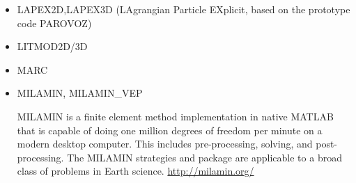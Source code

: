 \begin{itemize}
\item LAPEX2D,LAPEX3D  (LAgrangian Particle EXplicit, based on the prototype code PAROVOZ) 

\begin{scriptsize}
\cite{sopg05}\cite{baso05}\cite{soba05}
\cite{bube06}\cite{basv06}\cite{sobk06}\cite{peso06}
\cite{peso08}\cite{baso08}\cite{scbe08}
\cite{sosk11}
\end{scriptsize}

\item LITMOD2D/3D

{\small 
\noindent
\cite{afrf07}
\cite{affr08}
\cite{fuac09}
\cite{fufa10}
\cite{jitf19}
}

\item MARC

{\small
\noindent
\cite{nesg97}
\cite{nesb99}
}


\item {\codefont MILAMIN, MILAMIN\_VEP} 

MILAMIN is a finite element method implementation in native MATLAB that is capable of doing one million degrees of freedom per minute on a modern desktop computer. This includes pre-processing, solving, and post-processing. The MILAMIN strategies and package are applicable to a broad class of problems in Earth science. \url{http://milamin.org/}


\end{itemize}
